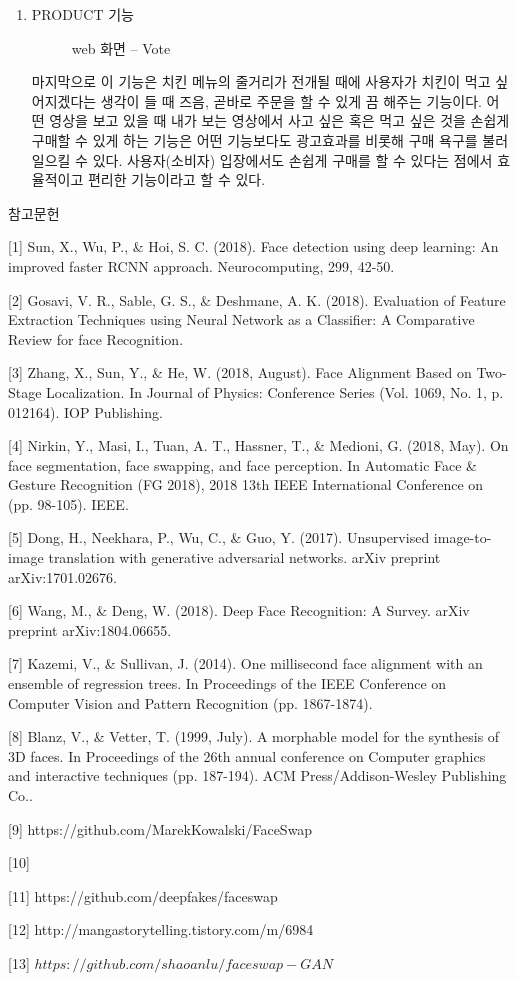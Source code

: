 \documentclass{oblivoir}
\begin{document}
\begin{enumerate}
\begin{enumerate}
        \item PRODUCT 기능
        
        \begin{figure}[h!]
            \centering
            \caption{web 화면 – Vote}
        \end{figure} 

    마지막으로 이 기능은 치킨 메뉴의 줄거리가 전개될 때에 사용자가 치킨이 먹고 싶어지겠다는 생각이 들 때 즈음, 곧바로 주문을 할 수 있게 끔 해주는 기능이다. 어떤 영상을 보고 있을 때 내가 보는 영상에서 사고 싶은 혹은 먹고 싶은 것을 손쉽게 구매할 수 있게 하는 기능은 어떤 기능보다도 광고효과를 비롯해 구매 욕구를 불러일으킬 수 있다. 사용자(소비자) 입장에서도 손쉽게 구매를 할 수 있다는 점에서 효율적이고 편리한 기능이라고 할 수 있다.
    \end{enumerate}
\end{enumerate}

참고문헌

[1] Sun, X., Wu, P., \& Hoi, S. C. (2018). Face detection using deep learning: An improved faster RCNN approach. Neurocomputing, 299, 42-50.

[2] Gosavi, V. R., Sable, G. S., \& Deshmane, A. K. (2018). Evaluation of Feature Extraction Techniques using Neural Network as a Classifier: A Comparative Review for face Recognition.

[3] Zhang, X., Sun, Y., \& He, W. (2018, August). Face Alignment Based on Two-Stage Localization. In Journal of Physics: Conference Series (Vol. 1069, No. 1, p. 012164). IOP Publishing.

[4] Nirkin, Y., Masi, I., Tuan, A. T., Hassner, T., \& Medioni, G. (2018, May). On face segmentation, face swapping, and face perception. In Automatic Face \& Gesture Recognition (FG 2018), 2018 13th IEEE International Conference on (pp. 98-105). IEEE.

[5] Dong, H., Neekhara, P., Wu, C., \& Guo, Y. (2017). Unsupervised image-to-image translation with generative adversarial networks. arXiv preprint arXiv:1701.02676.

[6] Wang, M., \& Deng, W. (2018). Deep Face Recognition: A Survey. arXiv preprint arXiv:1804.06655.

[7] Kazemi, V., \& Sullivan, J. (2014). One millisecond face alignment with an ensemble of regression trees. In Proceedings of the IEEE Conference on Computer Vision and Pattern Recognition (pp. 1867-1874).

[8] Blanz, V., \& Vetter, T. (1999, July). A morphable model for the synthesis of 3D faces. In Proceedings of the 26th annual conference on Computer graphics and interactive techniques (pp. 187-194). ACM Press/Addison-Wesley Publishing Co..

[9] https://github.com/MarekKowalski/FaceSwap

[10] 

[11] https://github.com/deepfakes/faceswap

[12] http://mangastorytelling.tistory.com/m/6984

[13] $https://github.com/shaoanlu/faceswap-GAN$
\end{document}
